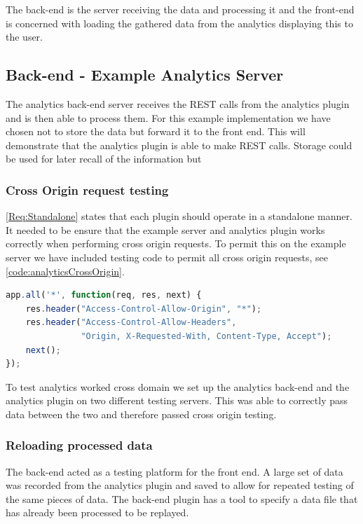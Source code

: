 The back-end is the server receiving the data and processing it and the front-end is concerned with loading the gathered data from the analytics displaying this to the user.

\subsection{Back-end - Example Analytics Server}
\label{Subsection:Analytics server in example}

The analytics back-end server receives the REST calls from the analytics plugin and is then able to process them. For this example implementation we have chosen not to store the data but forward it to the front end. This will demonstrate that the analytics plugin is able to make REST calls. Storage could be used for later recall of the information but 

\subsubsection{Cross Origin request testing}

\cref{Req:Standalone} states that each plugin should operate in a standalone manner. It needed to be ensure that the example server and analytics plugin works correctly when performing cross origin requests. To permit this on the example server we have included testing code to permit all cross origin requests, see \autoref{code:analyticsCrossOrigin}.

\begin{lstlisting}[language=javascript,caption={Code showing appending Cross Origin headers to all responses}, label={code:analyticsCrossOrigin}]
app.all('*', function(req, res, next) {
	res.header("Access-Control-Allow-Origin", "*");
	res.header("Access-Control-Allow-Headers",
	           "Origin, X-Requested-With, Content-Type, Accept");
	next();
});
\end{lstlisting}

To test analytics worked cross domain we set up the analytics back-end and the analytics plugin on two different testing servers. This was able to correctly pass data between the two and therefore passed cross origin testing.

\subsubsection{Reloading processed data}

The back-end acted as a testing platform for the front end. A large set of data was recorded from the analytics plugin and saved to allow for repeated testing of the same pieces of data. The back-end plugin has a tool to specify a data file that has already been processed to be replayed.

